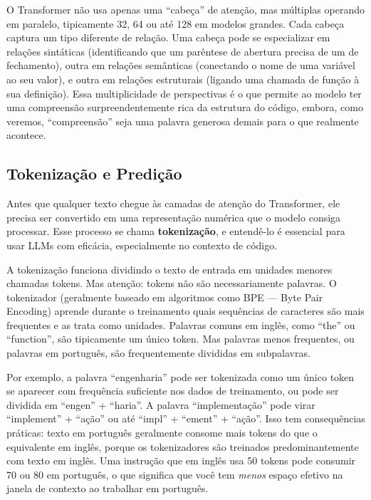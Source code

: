 O Transformer não usa apenas uma ``cabeça'' de atenção, mas múltiplas
operando em paralelo, tipicamente 32, 64 ou até 128 em modelos grandes. Cada
cabeça captura um tipo diferente de relação. Uma cabeça pode se especializar em
relações sintáticas (identificando que um parêntese de abertura precisa de um de
fechamento), outra em relações semânticas (conectando o nome de uma variável ao seu
valor), e outra em relações estruturais (ligando uma chamada de função à sua
definição). Essa multiplicidade de perspectivas é o que permite ao modelo ter uma
compreensão surpreendentemente rica da estrutura do código, embora, como veremos,
``compreensão'' seja uma palavra generosa demais para o que realmente acontece.

\subsection{Tokenização e Predição}

Antes que qualquer texto chegue às camadas de atenção do Transformer, ele precisa ser
convertido em uma representação numérica que o modelo consiga processar. Esse processo
se chama \textbf{tokenização}, e entendê-lo é essencial para usar LLMs com eficácia,
especialmente no contexto de código.

A tokenização funciona dividindo o texto de entrada em unidades menores chamadas
tokens. Mas atenção: tokens não são necessariamente palavras. O tokenizador (geralmente
baseado em algoritmos como BPE --- Byte Pair Encoding) aprende durante o treinamento
quais sequências de caracteres são mais frequentes e as trata como unidades. Palavras
comuns em inglês, como ``the'' ou ``function'', são tipicamente um único token. Mas
palavras menos frequentes, ou palavras em português, são frequentemente divididas em
subpalavras.

Por exemplo, a palavra ``engenharia'' pode ser tokenizada como um único token se
aparecer com frequência suficiente nos dados de treinamento, ou pode ser dividida em
``engen'' + ``haria''. A palavra ``implementação'' pode virar ``implement'' + ``ação''
ou até ``impl'' + ``ement'' + ``ação''. Isso tem consequências práticas: texto em
português geralmente consome mais tokens do que o equivalente em inglês, porque os
tokenizadores são treinados predominantemente com texto em inglês. Uma instrução que
em inglês usa 50 tokens pode consumir 70 ou 80 em português, o que significa que você
tem \textit{menos} espaço efetivo na janela de contexto ao trabalhar em português.

